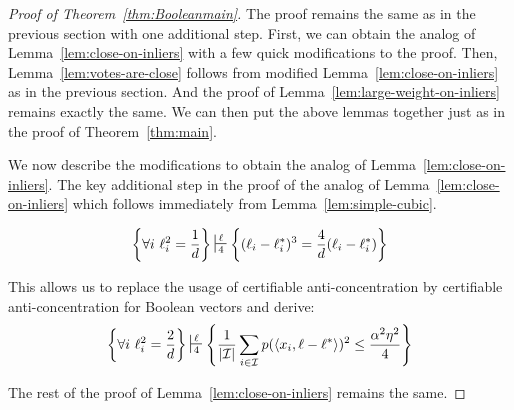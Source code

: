 \begin{proof}[Proof of Theorem~\ref{thm:Booleanmain}]
The proof remains the same as in the previous section with one additional step. 
First, we can obtain the analog of Lemma~\ref{lem:close-on-inliers} with a few quick modifications to the proof. 
Then, Lemma~\ref{lem:votes-are-close} follows from modified Lemma~\ref{lem:close-on-inliers} as in the previous section. 
And the proof of Lemma~\ref{lem:large-weight-on-inliers} remains exactly the same. 
We can then put the above lemmas together just as in the proof of Theorem~\ref{thm:main}. 

We now describe the modifications to obtain the analog of Lemma~\ref{lem:close-on-inliers}. 
The key additional step in the proof of the analog of Lemma~\ref{lem:close-on-inliers} which follows immediately from Lemma~\ref{lem:simple-cubic}.

\[
\Set{\forall i\text{ } \ell_i^2 = \frac{1}{d}} \sststile{4}{\ell} \Set{ (\ell_i - \ell_i^*)^{3} = \frac{4}{d} (\ell_i - \ell_i^*)}
\]

This allows us to replace the usage of certifiable anti-concentration by certifiable anti-concentration for Boolean vectors and derive:
\[
\Set{\forall i\text{ } \ell_i^2 = \frac{2}{d}} \sststile{4}{\ell} \Set{\frac{1}{|\cI|}\sum_{i \in \cI} p(\iprod{x_i,\ell-\ell^*})^2 \leq \frac{\alpha^2 \eta^2}{4} }
\]

The rest of the proof of Lemma~\ref{lem:close-on-inliers} remains the same. 




\end{proof}


